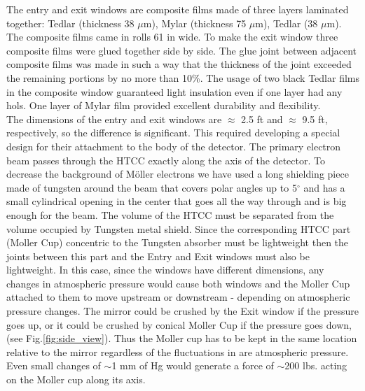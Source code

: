 \indent The entry and exit windows are composite films made of three layers laminated together: Tedlar (thickness 38 $\mu$m), Mylar (thickness 75 $\mu$m), Tedlar (38 $\mu$m). The composite films came in rolls 61 in wide. To make the exit window three composite films were glued together side by side. The glue joint between adjacent composite films was made in such a way that the thickness of the joint exceeded the remaining portions by no more than 10\%. The usage of two black Tedlar films in the composite window guaranteed light insulation even if one layer had any hols. One layer of Mylar film provided excellent durability and flexibility.
\\
\indent The dimensions of the entry and exit windows are $\approx$ 2.5 ft and $\approx$ 9.5 ft, respectively, so the difference is significant. This required developing a special design for their attachment to the body of the detector. The primary electron beam passes through the HTCC exactly along the axis of the detector. To decrease the background of M{\" o}ller electrons we have used a long shielding piece made of tungsten around the beam that covers polar angles up to 5$^\circ$ and has a small cylindrical opening in the center that goes all the way through and is big enough for the beam. The volume of the HTCC must be separated from the volume occupied by Tungsten metal shield. Since the corresponding HTCC part (Moller Cup) concentric to the Tungsten absorber must be lightweight then the joints between this part and the Entry and Exit windows  must also be lightweight. In this case, since the windows have different dimensions, any changes in atmospheric pressure would cause both windows and the Moller Cup attached to them to move upstream or downstream - depending on atmospheric pressure changes. The mirror could be crushed by the Exit window if the pressure goes up, or it could be crushed by conical Moller Cup if the pressure goes down, (see Fig.\ref{fig:side_view}). Thus the Moller cup has to be kept in the same location relative to the mirror regardless of the fluctuations in are atmospheric pressure. Even small changes of $\sim$1 mm of Hg would generate a force of $\sim$200 lbs. acting on the Moller cup along its axis.  

